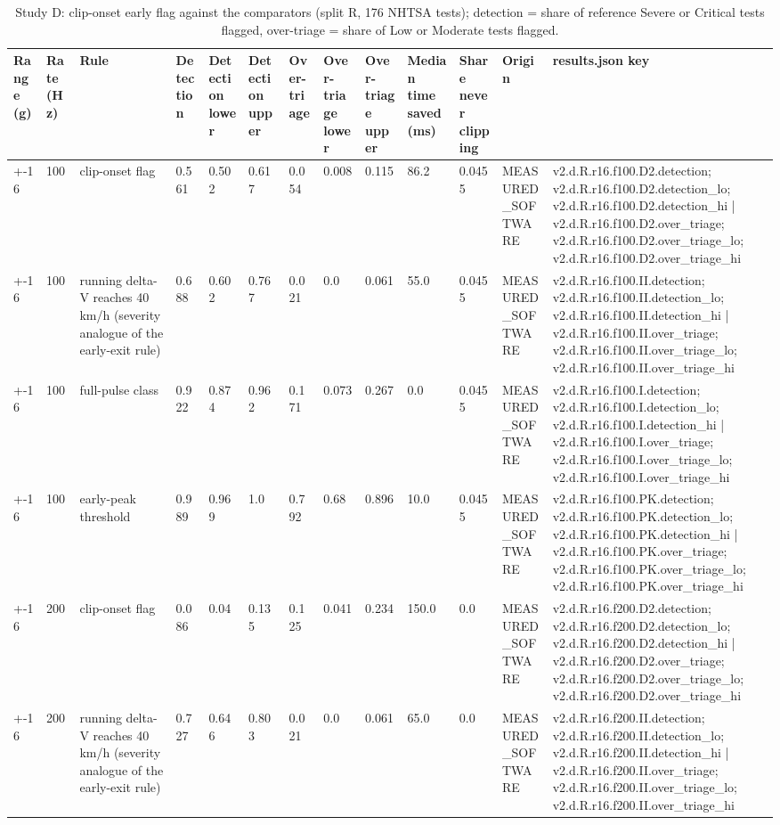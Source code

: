 \begin{table}[t]
\centering
\small
\caption{Study D: clip-onset early flag against the comparators (split R, 176 NHTSA tests); detection = share of reference Severe or Critical tests flagged, over-triage = share of Low or Moderate tests flagged.}
\label{tab:v2_tab_onset_flag}
\begin{tabular}{lllllllllllll}
\toprule
Range (g) & Rate (Hz) & Rule & Detection & Detection lower & Detection upper & Over-triage & Over-triage lower & Over-triage upper & Median time saved (ms) & Share never clipping & Origin & results.json key \\
\midrule
+-16 & 100 & clip-onset flag & 0.561 & 0.502 & 0.617 & 0.054 & 0.008 & 0.115 & 86.2 & 0.0455 & MEASURED\_SOFTWARE & v2.d.R.r16.f100.D2.detection; v2.d.R.r16.f100.D2.detection\_lo; v2.d.R.r16.f100.D2.detection\_hi | v2.d.R.r16.f100.D2.over\_triage; v2.d.R.r16.f100.D2.over\_triage\_lo; v2.d.R.r16.f100.D2.over\_triage\_hi \\
+-16 & 100 & running delta-V reaches 40 km/h (severity analogue of the early-exit rule) & 0.688 & 0.602 & 0.767 & 0.021 & 0.0 & 0.061 & 55.0 & 0.0455 & MEASURED\_SOFTWARE & v2.d.R.r16.f100.II.detection; v2.d.R.r16.f100.II.detection\_lo; v2.d.R.r16.f100.II.detection\_hi | v2.d.R.r16.f100.II.over\_triage; v2.d.R.r16.f100.II.over\_triage\_lo; v2.d.R.r16.f100.II.over\_triage\_hi \\
+-16 & 100 & full-pulse class & 0.922 & 0.874 & 0.962 & 0.171 & 0.073 & 0.267 & 0.0 & 0.0455 & MEASURED\_SOFTWARE & v2.d.R.r16.f100.I.detection; v2.d.R.r16.f100.I.detection\_lo; v2.d.R.r16.f100.I.detection\_hi | v2.d.R.r16.f100.I.over\_triage; v2.d.R.r16.f100.I.over\_triage\_lo; v2.d.R.r16.f100.I.over\_triage\_hi \\
+-16 & 100 & early-peak threshold & 0.989 & 0.969 & 1.0 & 0.792 & 0.68 & 0.896 & 10.0 & 0.0455 & MEASURED\_SOFTWARE & v2.d.R.r16.f100.PK.detection; v2.d.R.r16.f100.PK.detection\_lo; v2.d.R.r16.f100.PK.detection\_hi | v2.d.R.r16.f100.PK.over\_triage; v2.d.R.r16.f100.PK.over\_triage\_lo; v2.d.R.r16.f100.PK.over\_triage\_hi \\
+-16 & 200 & clip-onset flag & 0.086 & 0.04 & 0.135 & 0.125 & 0.041 & 0.234 & 150.0 & 0.0 & MEASURED\_SOFTWARE & v2.d.R.r16.f200.D2.detection; v2.d.R.r16.f200.D2.detection\_lo; v2.d.R.r16.f200.D2.detection\_hi | v2.d.R.r16.f200.D2.over\_triage; v2.d.R.r16.f200.D2.over\_triage\_lo; v2.d.R.r16.f200.D2.over\_triage\_hi \\
+-16 & 200 & running delta-V reaches 40 km/h (severity analogue of the early-exit rule) & 0.727 & 0.646 & 0.803 & 0.021 & 0.0 & 0.061 & 65.0 & 0.0 & MEASURED\_SOFTWARE & v2.d.R.r16.f200.II.detection; v2.d.R.r16.f200.II.detection\_lo; v2.d.R.r16.f200.II.detection\_hi | v2.d.R.r16.f200.II.over\_triage; v2.d.R.r16.f200.II.over\_triage\_lo; v2.d.R.r16.f200.II.over\_triage\_hi \\

\end{tabular}
\end{table}
